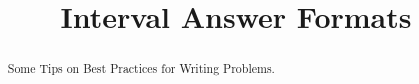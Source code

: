 \documentclass{ximera}
\title{Interval Answer Formats}
\begin{document}
\begin{abstract}
Some Tips on Best Practices for Writing Problems.
\end{abstract}
\maketitle
\end{document}
